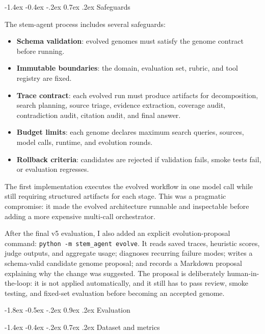 \documentclass[10pt]{article}
\makeatletter
\renewcommand\section{\@startsection{section}{1}{\z@}%
  {-1.8ex \@plus -0.5ex \@minus -.2ex}%
  {0.9ex \@plus .2ex}%
  {\normalfont\large\bfseries}}
\renewcommand\subsection{\@startsection{subsection}{2}{\z@}%
  {-1.4ex \@plus -0.4ex \@minus -.2ex}%
  {0.7ex \@plus .2ex}%
  {\normalfont\normalsize\bfseries}}
\makeatother
\begin{document}
\subsection{Safeguards}

The stem-agent process includes several safeguards:

\begin{itemize}
    \item \textbf{Schema validation}: evolved genomes must satisfy the genome contract before running.
    \item \textbf{Immutable boundaries}: the domain, evaluation set, rubric, and tool registry are fixed.
    \item \textbf{Trace contract}: each evolved run must produce artifacts for decomposition, search planning, source triage, evidence extraction, coverage audit, contradiction audit, citation audit, and final answer.
    \item \textbf{Budget limits}: each genome declares maximum search queries, sources, model calls, runtime, and evolution rounds.
    \item \textbf{Rollback criteria}: candidates are rejected if validation fails, smoke tests fail, or evaluation regresses.
\end{itemize}

The first implementation executes the evolved workflow in one model call while still requiring structured artifacts for each stage. This was a pragmatic compromise: it made the evolved architecture runnable and inspectable before adding a more expensive multi-call orchestrator.

After the final v5 evaluation, I also added an explicit evolution-proposal command: \texttt{python -m stem\_agent evolve}. It reads saved traces, heuristic scores, judge outputs, and aggregate usage; diagnoses recurring failure modes; writes a schema-valid candidate genome proposal; and records a Markdown proposal explaining why the change was suggested. The proposal is deliberately human-in-the-loop: it is not applied automatically, and it still has to pass review, smoke testing, and fixed-set evaluation before becoming an accepted genome.

\section{Evaluation}

\subsection{Dataset and metrics}
\end{document}
